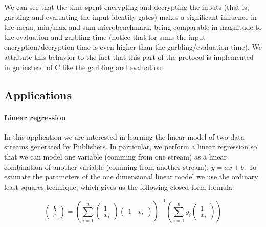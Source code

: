 We can see that the time spent encrypting and decrypting the inputs (that is,
garbling and evaluating the input identity gates) makes a significant influence
in the mean, min/max and sum microbenchmark, being comparable in magnitude to
the evaluation and garbling time (notice that for sum, the input
encryption/decryption time is even higher than the garbling/evaluation time).
We attribute this behavior to the fact that this part of the protocol is
implemented in go instead of C like the garbling and evaluation.

\subsection{Applications}

\paragraph{Linear regression}



In this application we are interested in learning the linear model of two data
streams generated by Publishers.  In particular, we perform a linear regression
so that we can model one variable (comming from one stream) as a linear
combination of another variable (comming from another stream): $y = ax + b$.
To estimate the parameters of the one dimensional linear model we use the
ordinary least squares technique, which gives us the following closed-form
formula:

\[
\begin{pmatrix} b \\ c \end{pmatrix} =
\left( \displaystyle\sum_{i=1}^n \begin{pmatrix} 1 \\ x_i \end{pmatrix}
  \begin{pmatrix} 1 & x_i\end{pmatrix}\right)^{-1}
\left( \displaystyle\sum_{i=1}^n y_i \begin{pmatrix} 1 \\ x_i \end{pmatrix}\right)
\]
\bigskip

